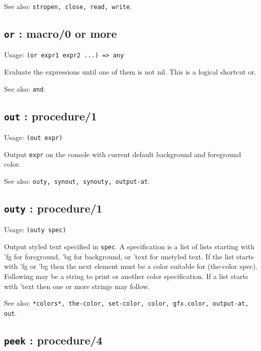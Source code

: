 \documentclass[
]{article}
\newcommand{\passthrough}[1]{#1}
\begin{document}
See also: \passthrough{\lstinline!stropen, close, read, write!}.

\hypertarget{or-macro0-or-more-1}{%
\subsection{\texorpdfstring{\texttt{or} : macro/0 or
more}{or : macro/0 or more}}\label{or-macro0-or-more-1}}

Usage: \passthrough{\lstinline!(or expr1 expr2 ...) => any!}

Evaluate the expressions until one of them is not nil. This is a logical
shortcut or.

See also: \passthrough{\lstinline!and!}.

\hypertarget{out-procedure1-1}{%
\subsection{\texorpdfstring{\texttt{out} :
procedure/1}{out : procedure/1}}\label{out-procedure1-1}}

Usage: \passthrough{\lstinline!(out expr)!}

Output \passthrough{\lstinline!expr!} on the console with current
default background and foreground color.

See also: \passthrough{\lstinline!outy, synout, synouty, output-at!}.

\hypertarget{outy-procedure1-1}{%
\subsection{\texorpdfstring{\texttt{outy} :
procedure/1}{outy : procedure/1}}\label{outy-procedure1-1}}

Usage: \passthrough{\lstinline!(outy spec)!}

Output styled text specified in \passthrough{\lstinline!spec!}. A
specification is a list of lists starting with 'fg for foreground, 'bg
for background, or 'text for unstyled text. If the list starts with 'fg
or 'bg then the next element must be a color suitable for (the-color
spec). Following may be a string to print or another color
specification. If a list starts with 'text then one or more strings may
follow.

See also:
\passthrough{\lstinline!*colors*, the-color, set-color, color, gfx.color, output-at, out!}.

\hypertarget{peek-procedure4-1}{%
\subsection{\texorpdfstring{\texttt{peek} :
procedure/4}{peek : procedure/4}}\label{peek-procedure4-1}}
\end{document}
